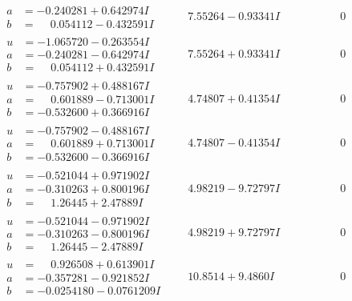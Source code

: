 \documentclass[1p]{elsarticle_modified}
\theoremstyle{definition}
\begin{document}
$$\begin{array}{c|c|c}
\begin{aligned}
a &= -0.240281 + 0.642974 I \\
b &= \phantom{-}0.054112 - 0.432591 I\end{aligned}
 & \phantom{-}7.55264 - 0.93341 I & \phantom{-0.000000 } 0 \\ \hline\begin{aligned}
u &= -1.065720 - 0.263554 I \\
a &= -0.240281 - 0.642974 I \\
b &= \phantom{-}0.054112 + 0.432591 I\end{aligned}
 & \phantom{-}7.55264 + 0.93341 I & \phantom{-0.000000 } 0 \\ \hline\begin{aligned}
u &= -0.757902 + 0.488167 I \\
a &= \phantom{-}0.601889 - 0.713001 I \\
b &= -0.532600 + 0.366916 I\end{aligned}
 & \phantom{-}4.74807 + 0.41354 I & \phantom{-0.000000 } 0 \\ \hline\begin{aligned}
u &= -0.757902 - 0.488167 I \\
a &= \phantom{-}0.601889 + 0.713001 I \\
b &= -0.532600 - 0.366916 I\end{aligned}
 & \phantom{-}4.74807 - 0.41354 I & \phantom{-0.000000 } 0 \\ \hline\begin{aligned}
u &= -0.521044 + 0.971902 I \\
a &= -0.310263 + 0.800196 I \\
b &= \phantom{-}1.26445 + 2.47889 I\end{aligned}
 & \phantom{-}4.98219 - 9.72797 I & \phantom{-0.000000 } 0 \\ \hline\begin{aligned}
u &= -0.521044 - 0.971902 I \\
a &= -0.310263 - 0.800196 I \\
b &= \phantom{-}1.26445 - 2.47889 I\end{aligned}
 & \phantom{-}4.98219 + 9.72797 I & \phantom{-0.000000 } 0 \\ \hline\begin{aligned}
u &= \phantom{-}0.926508 + 0.613901 I \\
a &= -0.357281 - 0.921852 I \\
b &= -0.0254180 - 0.0761209 I\end{aligned}
 & \phantom{-}10.8514 + 9.4860 I & \phantom{-0.000000 } 0 \\ \hline\begin{aligned}

\end{aligned}
\end{array}$$
\end{document}
